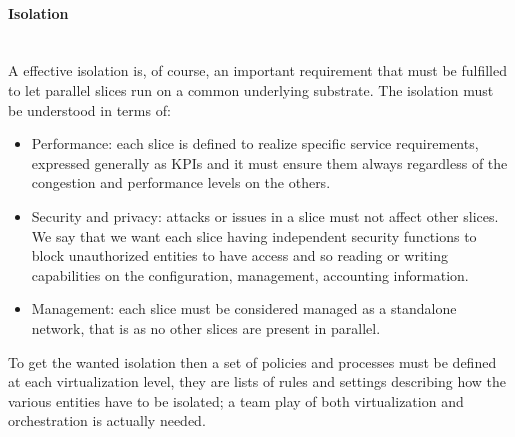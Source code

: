\documentclass[a4paper,12pt]{report} %
\begin{document}
\paragraph{Isolation}\mbox{}\\
A effective isolation is, of course, an important requirement that must
be fulfilled to let parallel slices run on a common underlying substrate. The isolation
must be understood in terms of:
\begin{itemize}
\item Performance: each slice is defined to realize specific service requirements, expressed generally as \gls{KPI}s and it must ensure them
always regardless of the congestion and performance levels on the others.
\end{itemize}
\begin{itemize}
\item Security and privacy: attacks or issues in a slice must not affect
other slices. We say that we want each slice having
independent security functions to block unauthorized entities to have access and so reading or writing capabilities on the configuration, management, accounting information.
\end{itemize}
\begin{itemize}
\item Management: each slice must be considered managed as a standalone network, that is as no other slices are present in parallel.
\end{itemize}
To get the wanted isolation then a set of policies and processes must be defined
at each virtualization level, they are lists of rules and settings describing how the various entities have to be isolated; a team play of both virtualization and orchestration is actually needed.\cite{ordonez2017network} \cite{rostami2017orchestration}
\end{document}
